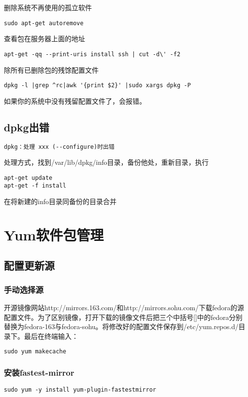 删除系统不再使用的孤立软件
\begin{verbatim}
sudo apt-get autoremove
\end{verbatim}

查看包在服务器上面的地址
\begin{verbatim}
apt-get -qq --print-uris install ssh | cut -d\' -f2
\end{verbatim}

除所有已删除包的残馀配置文件
\begin{verbatim}
dpkg -l |grep ^rc|awk '{print $2}' |sudo xargs dpkg -P 
\end{verbatim}
如果你的系统中没有残留配置文件了，会报错。

\subsection{dpkg出错}
\label{err:dpkgConfig}
\begin{verbatim}
dpkg：处理 xxx (--configure)时出错
\end{verbatim}
处理方式，找到/var/lib/dpkg/info目录，备份他处，重新目录，执行
\begin{verbatim}
apt-get update
apt-get -f install
\end{verbatim}
在将新建的info目录同备份的目录合并

\section{Yum软件包管理}
\label{yum}
\subsection{配置更新源}
\subsubsection{手动选择源}
开源镜像网站http://mirrors.163.com/和http://mirrors.sohu.com/下载fedora的源配置文件。为了区别镜像，打开下载的镜像文件后把三个中括号[]中的fedora分别替换为fedora-163与fedora-sohu。将修改好的配置文件保存到/etc/yum.repos.d/目录下。最后在终端输入：
\begin{lstlisting}
sudo yum makecache
\end{lstlisting}

\subsubsection{安装fastest-mirror}
\begin{lstlisting}
sudo yum -y install yum-plugin-fastestmirror 
\end{lstlisting}

